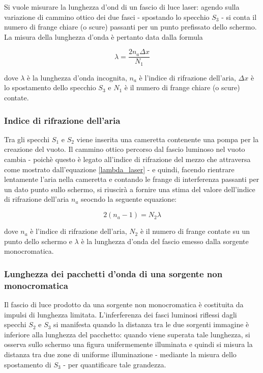 \documentclass[]{article}
\begin{document}
Si vuole misurare la lunghezza d'ond di un fascio di luce laser: agendo sulla variazione di cammino ottico dei due fasci - spostando lo specchio $S_3$ - si conta il numero di frange chiare (o scure) passanti per un punto prefissato dello schermo. La misura della lunghezza d'onda è pertanto data dalla formula

\begin{equation}
    \label{lambda_laser}
    \lambda = \frac{2 n_a \Delta x}{N_1}
\end{equation}

dove $\lambda$ è la lunghezza d'onda incognita, $n_a$ è l'indice di rifrazione dell'aria, $\Delta x$ è lo spostamento dello specchio $S_3$ e $N_1$ è il numero di frange chiare (o scure) contate.

\subsubsection{Indice di rifrazione dell'aria}

Tra gli specchi $S_1$ e $S_2$ viene inserita una cameretta contenente una pompa per la creazione del vuoto. Il cammino ottico percorso dal fascio luminoso nel vuoto cambia - poichè questo è legato all'indice di rifrazione del mezzo che attraversa come mostrato dall'equazione \ref{lambda_laser} - e quindi, facendo rientrare lentamente l'aria nella cameretta e contando le frange di interferenza passanti per un dato punto sullo schermo, si riuscirà a fornire una stima del valore dell'indice di rifrazione dell'aria $n_a$ seocndo la seguente equazione:

\begin{equation}
    \label{n_a}
    2(n_a - 1) = N_2 \lambda
\end{equation}

dove $n_a$ è l'indice di rifrazione dell'aria, $N_2$ è il numero di frange contate su un punto dello schermo e $\lambda$ è la lunghezza d'onda del fascio emesso dalla sorgente monocromatica.

\subsubsection{Lunghezza dei pacchetti d'onda di una sorgente non monocromatica}

Il fascio di luce prodotto da una sorgente non monocromatica è costituita da impulsi di lunghezza limitata. L'inferferenza dei fasci luminosi riflessi dagli specchi $S_2$ e $S_3$ si manifesta quando la distanza tra le due sorgenti immagine è inferiore alla lunghezza del pacchetto: quando viene superata tale lunghezza, si osserva sullo schermo una figura unifermemente illuminata e quindi si misura la distanza tra due zone di uniforme illuminazione - mediante la misura dello spostamento di $S_3$ - per quantificare tale grandezza.
\end{document}
